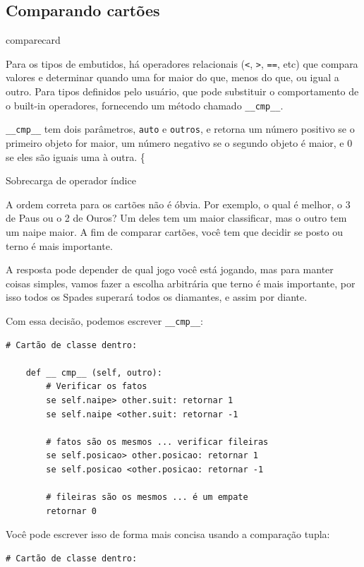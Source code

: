\documentclass[10pt]{book}
\begin{document}
\begin{v erbatim}
{\section{Comparando cartões}
\label{} comparecard

Para os tipos de embutidos, há operadores relacionais
({\tt <}, {\tt>}, {\tt ==}, etc)
que compara
valores e determinar quando uma for maior do que, menos do que, ou igual a
outro. Para tipos definidos pelo usuário, que pode substituir o comportamento de
o built-in operadores, fornecendo um método chamado
\Verb "__cmp__".  

\Verb "__cmp__" tem dois parâmetros, {\tt auto} e {\tt outros},
e retorna um número positivo se o primeiro objeto for maior, um
número negativo se o segundo objeto é maior, e 0 se eles são
iguais uma à outra.
\{} Sobrecarga de operador índice

A ordem correta para os cartões não é óbvia.
Por exemplo, o qual
é melhor, o 3 de Paus ou o 2 de Ouros? Um deles tem um maior
classificar, mas o outro tem um naipe maior. A fim de comparar
cartões, você tem que decidir se posto ou terno é mais importante.

A resposta pode depender de qual jogo você está jogando, mas para manter
coisas simples, vamos fazer a escolha arbitrária que terno é mais
importante, por isso todos os Spades superará todos os diamantes,
e assim por diante.

Com essa decisão, podemos escrever \verb "__cmp__":

\begin{verbatim}
# Cartão de classe dentro:

    def __ cmp__ (self, outro):
        # Verificar os fatos
        se self.naipe> other.suit: retornar 1
        se self.naipe <other.suit: retornar -1

        # fatos são os mesmos ... verificar fileiras
        se self.posicao> other.posicao: retornar 1
        se self.posicao <other.posicao: retornar -1

        # fileiras são os mesmos ... é um empate
        retornar 0    
\end{verbatim}
%
Você pode escrever isso de forma mais concisa usando a comparação tupla:

\begin{verbatim}
# Cartão de classe dentro:


\end{verbatim}
\end{v erbatim}
\end{document}
